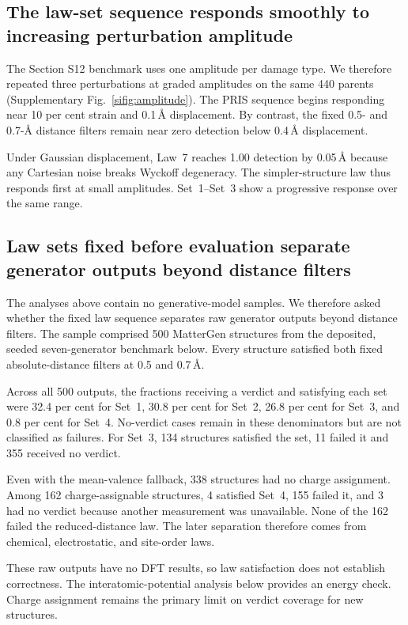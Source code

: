 \subsection{The law-set sequence responds smoothly to increasing perturbation amplitude}

The Section S12 benchmark uses one amplitude per damage type. We therefore repeated
three perturbations at graded amplitudes on the same 440 parents (Supplementary
Fig.~\ref{sifig:amplitude}). The PRIS sequence begins responding near 10 per cent
strain and 0.1\,\AA{} displacement. By contrast, the fixed 0.5- and 0.7-\AA{}
distance filters remain near zero detection below 0.4\,\AA{} displacement.

Under Gaussian displacement, Law~7 reaches 1.00 detection by 0.05\,\AA{} because
any Cartesian noise breaks Wyckoff degeneracy. The simpler-structure law thus
responds first at small amplitudes. Set~1--Set~3 show a progressive response over
the same range.

\subsection{Law sets fixed before evaluation separate generator outputs beyond distance filters}

The analyses above contain no generative-model samples. We therefore asked
whether the fixed law sequence separates raw generator outputs beyond distance
filters. The sample comprised 500 MatterGen structures from the deposited,
seeded seven-generator benchmark below. Every structure satisfied both fixed
absolute-distance filters at 0.5 and 0.7\,\AA{}.

Across all 500 outputs, the fractions receiving a verdict and satisfying each
set were 32.4 per cent for Set~1, 30.8 per cent for Set~2, 26.8 per cent for
Set~3, and 0.8 per cent for Set~4. No-verdict cases remain in these denominators
but are not classified as failures. For Set~3, 134 structures satisfied the set,
11 failed it and 355 received no verdict.

Even with the mean-valence fallback, 338 structures had no charge assignment.
Among 162 charge-assignable structures, 4 satisfied Set~4, 155 failed it, and 3
had no verdict because another measurement was unavailable. None of the 162
failed the reduced-distance law. The later separation therefore comes
from chemical, electrostatic, and site-order laws.

These raw outputs have no DFT results, so law satisfaction does not establish
correctness. The interatomic-potential analysis below provides an energy check.
Charge assignment remains the primary limit on verdict coverage for new
structures.

